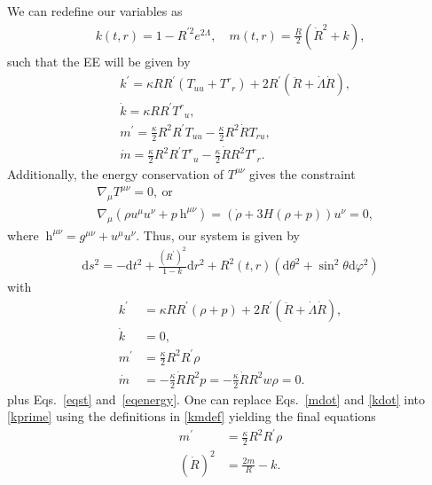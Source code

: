 \documentclass[a4paper,11pt]{article}
\begin{document}
We can redefine our variables as
\begin{align}
	\label{kmdef}
	k(t, r)=1-R^{\prime 2} e^{2 \Lambda}, \quad m(t, r)=\frac{R}{2}\left(\dot{R}^2+k\right)
	,\end{align}
such that the EE will be given by
\begin{align}
	 & k^{\prime} = \kappa RR^{\prime}\left(T_{uu}+T^{r}{}_{r}\right)+2R^{\prime}\left(\ddot{R}+\dot{\Lambda}\dot{R}\right), \\
	 & \dot{k} = \kappa RR^{\prime}T^{r}{}_{u},                                                                              \\
	 & m^{\prime} =\frac{\kappa}{2} R^{2}R^{\prime}T_{uu}-\frac{\kappa}{2} R^{2}\dot{R}T_{ru},                               \\
	 & \dot{m} =\frac{\kappa}{2} R^{2}R^{\prime}T^{r}{}_{u}-\frac{\kappa}{2}\dot{R}R^{2}T^{r}{}_{r}
	.\end{align}
Additionally, the energy conservation of $T^{\mu\nu}$ gives the constraint
\begin{align}
	\label{eqenergy}
	 & \nabla_{\mu}T^{\mu\nu}=0,~\text{or}\nonumber                                                 \\
	 & \nabla_\mu(\rho u^\mu u^\nu+p\mathrm{~h}^{\mu\nu})=\left(\dot{\rho}+3H(\rho+p)\right)u^\nu=0
	,\end{align}
where $\mathrm{~h}^{\mu\nu} = g^{\mu\nu} + u^\mu u^\nu $.
Thus, our system is given by
\begin{align}
	\label{metricgen}
	\mathrm{d} s^2=-\mathrm{d} t^2+\frac{(R^\prime)^{2}}{1 - k} \mathrm{d} r^2+R^2(t, r)\left(\mathrm{d} \theta^2+\sin ^2 \theta \mathrm{d} \varphi^2\right)
\end{align}
with
\begin{align}
	\label{kprime}
	k^{\prime} & =\kappa RR^{\prime}\left(\rho+p\right)+2R^{\prime}\left(\ddot{R}+\dot{\Lambda}\dot{R}\right), \\
	\label{kdot}
	\dot{k}    & = 0,                                                                                          \\
	m^{\prime} & =\frac{\kappa}{2} R^{2}R^{\prime}\rho                                                         \\
	\label{mdot}
	\dot{m}    & =-\frac{\kappa}{2}\dot{R}R^{2}p = -\frac{\kappa}{2}\dot{R}R^{2} w\rho = 0.
\end{align}
plus Eqs.~\eqref{eqst} and~\eqref{eqenergy}. One can replace Eqs.~\eqref{mdot} and
\eqref{kdot} into \eqref{kprime} using the definitions in \eqref{kmdef} yielding the
final equations
\begin{align}
	\label{mprime}
	m^{\prime}  & =\frac{\kappa}{2} R^{2}R^{\prime}\rho \\
	\label{rdot}
	(\dot{R})^2 & = \frac{2m}{R}-k
	.\end{align}
\end{document}
